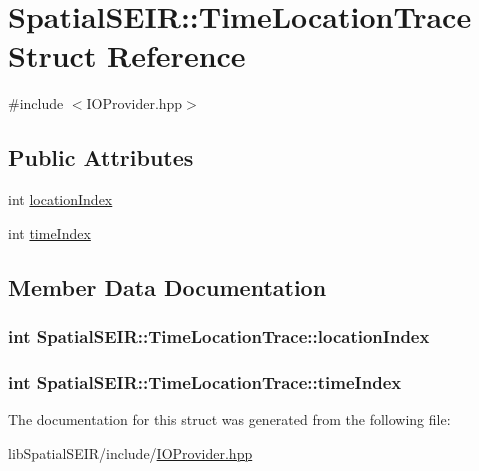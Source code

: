 \hypertarget{structSpatialSEIR_1_1TimeLocationTrace}{\section{Spatial\-S\-E\-I\-R\-:\-:Time\-Location\-Trace Struct Reference}
\label{structSpatialSEIR_1_1TimeLocationTrace}
}


{\ttfamily \#include $<$I\-O\-Provider.\-hpp$>$}

\subsection*{Public Attributes}
\begin{DoxyCompactItemize}
\item 
int \hyperlink{structSpatialSEIR_1_1TimeLocationTrace_a5196dce9802a7e407273f02e4a92aab2}{location\-Index}
\item 
int \hyperlink{structSpatialSEIR_1_1TimeLocationTrace_a5d006c0c9b1226c25baffc56a4736441}{time\-Index}
\end{DoxyCompactItemize}


\subsection{Member Data Documentation}
\hypertarget{structSpatialSEIR_1_1TimeLocationTrace_a5196dce9802a7e407273f02e4a92aab2}{
\subsubsection[{location\-Index}]{\setlength{\rightskip}{0pt plus 5cm}int Spatial\-S\-E\-I\-R\-::\-Time\-Location\-Trace\-::location\-Index}}\label{structSpatialSEIR_1_1TimeLocationTrace_a5196dce9802a7e407273f02e4a92aab2}
\hypertarget{structSpatialSEIR_1_1TimeLocationTrace_a5d006c0c9b1226c25baffc56a4736441}{
\subsubsection[{time\-Index}]{\setlength{\rightskip}{0pt plus 5cm}int Spatial\-S\-E\-I\-R\-::\-Time\-Location\-Trace\-::time\-Index}}\label{structSpatialSEIR_1_1TimeLocationTrace_a5d006c0c9b1226c25baffc56a4736441}


The documentation for this struct was generated from the following file\-:\begin{DoxyCompactItemize}
\item 
lib\-Spatial\-S\-E\-I\-R/include/\hyperlink{IOProvider_8hpp}{I\-O\-Provider.\-hpp}\end{DoxyCompactItemize}
